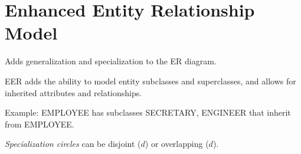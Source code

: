 \documentclass[english]{exam}
\begin{document}
	
    \section{Enhanced Entity Relationship Model}
    
    Adds generalization and specialization to the ER diagram.
    
    EER adds the ability to model entity subclasses and superclasses, and allows for inherited attributes and relationships.
    
    Example: EMPLOYEE has subclasses SECRETARY, ENGINEER that inherit from EMPLOYEE.
    
    \textit{Specialization circles} can be disjoint ($d$) or overlapping ($d$).
     
\end{document}
